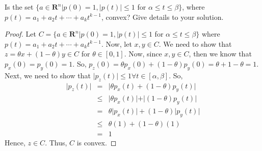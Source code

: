 \begin{prob}[1.5]
  Is the set $\{ a \in \mathbf{R}^{n} \vert p(0) = 1, \vert p(t) \vert \leq 1 $
  for $\alpha \leq t \leq \beta\}$, where
  $p(t) = a_{1} + a_{2}t + \cdots + a_{k}t^{k-1}$, convex? Give details to your
  solution.
\end{prob}
\begin{proof}
  Let $C = \{ a \in \mathbf{R}^{n} \vert p(0) = 1, \vert p(t) \vert \leq 1 $
  for $\alpha \leq t \leq \beta\}$ where
  $p(t) = a_{1} + a_{2}t + \cdots + a_{k}t^{k-1}$.  Now, let $x,y \in C$. We need
  to show that $z = \theta x + (1- \theta)y \in C$ for $\theta \in [0,1]$.
  Now, since $x,y \in C$, then we know that $p_{x}(0) = p_{y}(0) = 1$. So,
  $p_{z}(0) = \theta p_{x}(0) + (1 - \theta)p_{y}(0) = \theta + 1 - \theta = 1$.
  Next, we need to show that $\vert p_{z}(t) \vert \leq 1 \forall t \in [\alpha,\beta]$. So,
  \begin{eqnarray*}
    \vert p_{z}(t) \vert &=& \vert \theta p_{x}(t) + (1 - \theta)p_{y}(t) \vert\\
    & \leq & \vert \theta p_{x}(t)\vert + \vert (1 - \theta)p_{y}(t) \vert\\
    &=& \theta \vert p_{x}(t)\vert + (1 - \theta)\vert p_{y}(t) \vert\\
    &\leq& \theta (1) + (1 - \theta)(1)\\
    &=&1
  \end{eqnarray*}
  Hence, $z \in C$. Thus, $C$ is convex.
  
  
\end{proof}
